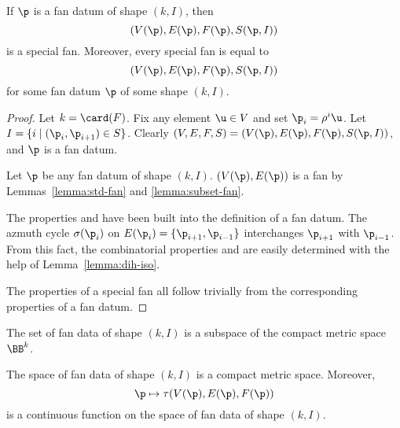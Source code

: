 \begin{lemma}[]
If $\p$ is a fan datum of shape $(k,I)$, then
\begin{displaymath}
(V(\p),E(\p),F(\p),S(\p,I))
\end{displaymath}
is a special fan.  Moreover, every special fan is equal to
\begin{displaymath}
(V(\p),E(\p),F(\p),S(\p,I))
\end{displaymath}
for some fan datum $\p$ of some shape $(k,I)$.
\end{lemma}

\begin{proof}
  Let $k=\card(F)$.  Fix any element $\u\in V$ and
set $\p_i = \rho^i \u$.  Let $I = \{i\mid (\p_i,\p_{i+1}) \in S\}$.
Clearly $(V,E,F,S)=(V(\p),E(\p),F(\p),S(\p,I))$, and $\p$ is a fan
datum.

Let $\p$ be any fan datum of shape $(k,I)$.
$(V(\p),E(\p))$
is a fan by Lemmas~\ref{lemma:std-fan} and \ref{lemma:subset-fan}.


 The properties
 and  have been built into the definition of a fan datum.  The azmuth cycle $\sigma(\p_i)$ on $E(\p_i) =
\{\p_{i+1},\p_{i-1}\}$ interchanges $\p_{i+1}$ with $\p_{i-1}$.  From
this fact, the combinatorial properties  and  are easily determined with
the help of Lemma~\ref{lemma:dih-iso}.  

 The properties
of a special fan all follow trivially from the corresponding
properties of a fan datum.
\end{proof}

The set of fan data of shape $(k,I)$ is a subspace of the compact metric
space $\BB^k$.


\begin{lemma}[]\label{lemma:compact-fan}
The space of fan data of shape $(k,I)$ is a compact metric space.
Moreover,
\begin{displaymath}
\p \mapsto \tau(V(\p),E(\p),F(\p))
\end{displaymath}
is a continuous function on the space of fan data of shape $(k,I)$.
\end{lemma}

